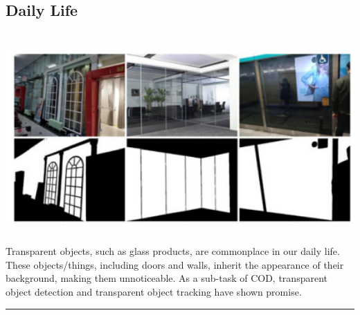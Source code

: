 \begin{multicols}{2}
\subsection{{{\fontsize{14}{19}\selectfont \textbf{Daily Life}}}}
\vspace{0.5cm}
\includegraphics[width=\columnwidth,height=8cm]{sections/LBP/use4.png}
\vspace{0.5cm}
Transparent objects, such as glass products, are commonplace in our daily life. These objects/things, including doors and walls, inherit the appearance of their background, making them unnoticeable. As a sub-task of COD, transparent object detection  and transparent object tracking have shown promise.
\end{multicols}

\vspace{0.5cm}
{\color{gray}\hrule}
\vspace{0.5cm}
